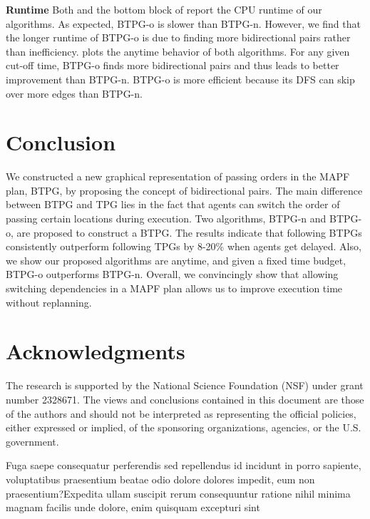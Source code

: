 \documentclass[letterpaper]{article} %
\theoremstyle{definition}
\begin{document}
\textbf{Runtime} Both  and the bottom block of  report the CPU runtime of our algorithms. As expected, BTPG-o is slower than BTPG-n. %
However, we find that the longer runtime of BTPG-o is due to finding more bidirectional pairs rather than inefficiency.  plots the anytime behavior of both algorithms. For any given cut-off time, BTPG-o finds more bidirectional pairs and thus leads to better improvement than BTPG-n. BTPG-o is more efficient because its DFS can skip over more edges than BTPG-n.




\vspace{-1.66mm}
\section{Conclusion}
We constructed a new graphical representation of passing orders in the MAPF plan, BTPG, by proposing the concept of bidirectional pairs. The main difference between BTPG and TPG lies in the fact that agents can switch the order of passing certain locations during execution. Two algorithms, BTPG-n and BTPG-o, are proposed to construct a BTPG. The results indicate that following BTPGs consistently outperform following TPGs by 8-20\% when agents get delayed. Also, we show our proposed algorithms are anytime, and given a fixed time budget, BTPG-o outperforms BTPG-n. Overall, we convincingly show that allowing switching dependencies in a MAPF plan allows us to improve execution time without replanning.


\vspace{-0.89mm}
\vspace{-1.49mm}
\section*{Acknowledgments}
The research is supported by the National Science Foundation (NSF) under grant number 2328671. The views and conclusions contained in this document are those of the authors and should not be interpreted as representing the official policies, either expressed or implied, of the sponsoring organizations, agencies, or the U.S. government.


Fuga saepe consequatur perferendis sed repellendus id incidunt in porro sapiente, voluptatibus praesentium beatae odio dolore dolores impedit, eum non praesentium?Expedita ullam suscipit rerum consequuntur ratione nihil minima magnam facilis unde dolore, enim quisquam excepturi sint

\end{document}
